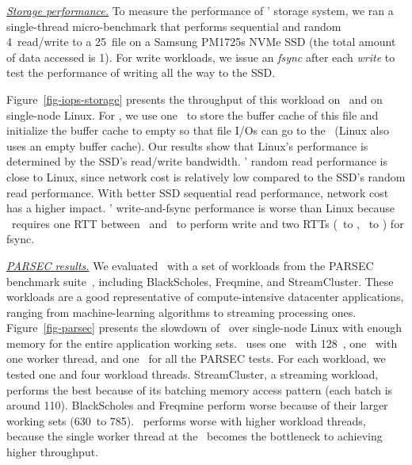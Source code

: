 \textit{\uline{Storage performance.}}
To measure the performance of \lego' storage system, we ran a single-thread micro-benchmark 
that performs sequential and random 4\KB\ read/write to a 25\GB\ file on a Samsung PM1725s NVMe SSD (the total amount of data accessed is 1\GB).
For write workloads, we issue an {\em fsync} after each {\em write} to test the performance of writing all the way to the SSD.

Figure~\ref{fig-iops-storage} presents the throughput of this workload on \lego\ and on single-node Linux.
For \lego, we use one \mcomponent\ to store the buffer cache of this file and initialize the buffer cache to empty
so that file I/Os can go to the \scomponent\ (Linux also uses an empty buffer cache).
Our results show that Linux's performance is determined by the SSD's read/write bandwidth.
\lego' random read performance is close to Linux, since network cost is relatively low compared to the SSD's random read performance.
With better SSD sequential read performance, network cost has a higher impact.
\lego' write-and-fsync performance is worse than Linux because
\lego\ requires one RTT between \pcomponent\ and \mcomponent\ to perform write 
and two RTTs (\pcomponent\ to \mcomponent, \mcomponent\ to \scomponent) for fsync.

\textit{\uline{PARSEC results.}}
We evaluated \lego\ with a set of workloads from the PARSEC benchmark suite~\cite{PARSEC},
including BlackScholes, Freqmine, and StreamCluster.
These workloads are a good representative of compute-intensive datacenter applications, 
ranging from machine-learning algorithms to streaming processing ones.
Figure~\ref{fig-parsec} presents the slowdown of \lego\ 
over single-node Linux with enough memory for the entire application working sets.
\lego\ uses one \pcomponent\ with 128\MB\ \excache,
one \mcomponent\ with one worker thread, and one \scomponent\ for all the PARSEC tests.
For each workload, we tested one and four workload threads.
StreamCluster, a streaming workload, performs the best because of its 
batching memory access pattern (each batch is around 110\MB).
BlackScholes and Freqmine perform worse because of their larger working sets (630\MB\ to 785\MB).
\lego\ performs worse with higher workload threads, 
because the single worker thread at the \mcomponent\ becomes the bottleneck to achieving higher throughput.


